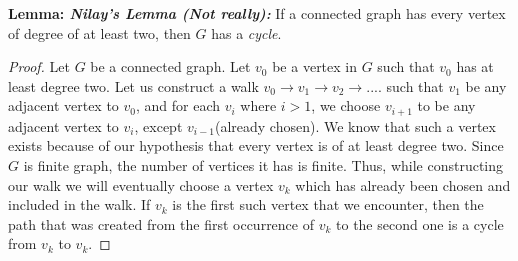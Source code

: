 \documentclass[12pt, fullpage]{article}
\begin{document}
\textbf{Lemma: \textit{Nilay's Lemma (Not really):}} If a connected graph has every vertex of degree of at least two, then $G$ has a \textit{cycle}.
\begin{proof}
Let $G$ be a connected graph. Let $v_0$ be a vertex in $G$ such that $v_0$ has at least degree two. Let us construct a walk $v_0 \rightarrow v_1 \rightarrow v_2 \rightarrow ....$ such that $v_1$ be any adjacent vertex to $v_0$, and for each $v_i$ where $i > 1$, we choose $v_{i+1}$ to be any adjacent vertex to $v_i$, except $v_{i-1}$(already chosen). We know that such a vertex exists because of our hypothesis that every vertex is of at least degree two. Since $G$ is finite graph, the number of vertices it has is finite. Thus, while constructing our walk we will eventually choose a vertex $v_k$ which has already been chosen and included in the walk. If $v_k$ is the first such vertex that we encounter, then the path that was created from the first occurrence of $v_k$ to the second one is a cycle from $v_k$ to $v_k$.
\end{proof}



\end{document}
